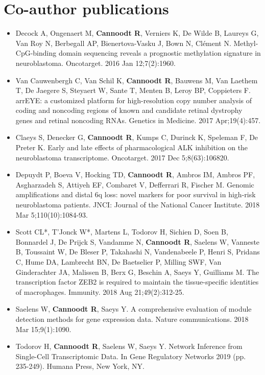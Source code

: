\section{Co-author publications}
\begin{itemize}
	\item Decock A, Ongenaert M, \textbf{Cannoodt R}, Verniers K, De Wilde B, Laureys G, Van Roy N, Berbegall AP, Bienertova-Vasku J, Bown N, Clément N. Methyl-CpG-binding domain sequencing reveals a prognostic methylation signature in neuroblastoma. Oncotarget. 2016 Jan 12;7(2):1960.
	\item Van Cauwenbergh C, Van Schil K, \textbf{Cannoodt R}, Bauwens M, Van Laethem T, De Jaegere S, Steyaert W, Sante T, Menten B, Leroy BP, Coppieters F. arrEYE: a customized platform for high-resolution copy number analysis of coding and noncoding regions of known and candidate retinal dystrophy genes and retinal noncoding RNAs. Genetics in Medicine. 2017 Apr;19(4):457.
	\item Claeys S, Denecker G, \textbf{Cannoodt R}, Kumps C, Durinck K, Speleman F, De Preter K. Early and late effects of pharmacological ALK inhibition on the neuroblastoma transcriptome. Oncotarget. 2017 Dec 5;8(63):106820.
	\item Depuydt P, Boeva V, Hocking TD, \textbf{Cannoodt R}, Ambros IM, Ambros PF, Asgharzadeh S, Attiyeh EF, Combaret V, Defferrari R, Fischer M. Genomic amplifications and distal 6q loss: novel markers for poor survival in high-risk neuroblastoma patients. JNCI: Journal of the National Cancer Institute. 2018 Mar 5;110(10):1084-93.
	\item Scott CL*, T'Jonck W*, Martens L, Todorov H, Sichien D, Soen B, Bonnardel J, De Prijck S, Vandamme N, \textbf{Cannoodt R}, Saelens W, Vanneste B, Toussaint W, De Bleser P, Takahashi N, Vandenabeele P, Henri S, Pridans C, Hume DA, Lambrecht BN, De Baetselier P, Milling SWF, Van Ginderachter JA, Malissen B, Berx G, Beschin A, Saeys Y, Guilliams M. The transcription factor ZEB2 is required to maintain the tissue-specific identities of macrophages. Immunity. 2018 Aug 21;49(2):312-25.
	\item Saelens W, \textbf{Cannoodt R}, Saeys Y. A comprehensive evaluation of module detection methods for gene expression data. Nature communications. 2018 Mar 15;9(1):1090.
	\item Todorov H, \textbf{Cannoodt R}, Saelens W, Saeys Y. Network Inference from Single-Cell Transcriptomic Data. In Gene Regulatory Networks 2019 (pp. 235-249). Humana Press, New York, NY.

\end{itemize}
